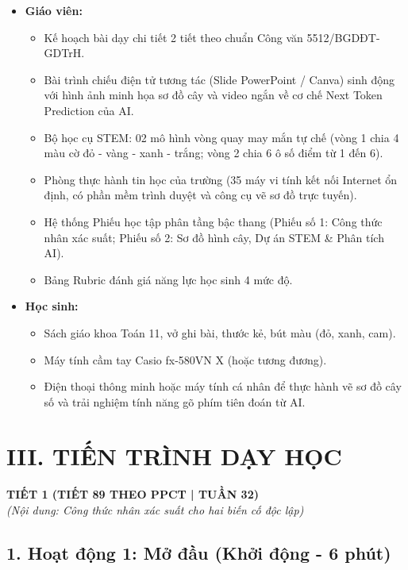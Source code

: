 \documentclass[12pt, a4paper]{article}
\begin{document}
\begin{itemize}[leftmargin=1.2cm]
    \item \textbf{Giáo viên:}
    \begin{itemize}[leftmargin=0.6cm]
        \item Kế hoạch bài dạy chi tiết 2 tiết theo chuẩn Công văn 5512/BGDĐT-GDTrH.
        \item Bài trình chiếu điện tử tương tác (Slide PowerPoint / Canva) sinh động với hình ảnh minh họa sơ đồ cây và video ngắn về cơ chế Next Token Prediction của AI.
        \item Bộ học cụ STEM: 02 mô hình vòng quay may mắn tự chế (vòng 1 chia 4 màu cờ đỏ - vàng - xanh - trắng; vòng 2 chia 6 ô số điểm từ 1 đến 6).
        \item Phòng thực hành tin học của trường (35 máy vi tính kết nối Internet ổn định, có phần mềm trình duyệt và công cụ vẽ sơ đồ trực tuyến).
        \item Hệ thống Phiếu học tập phân tầng bậc thang (Phiếu số 1: Công thức nhân xác suất; Phiếu số 2: Sơ đồ hình cây, Dự án STEM \& Phân tích AI).
        \item Bảng Rubric đánh giá năng lực học sinh 4 mức độ.
    \end{itemize}
    \item \textbf{Học sinh:}
    \begin{itemize}[leftmargin=0.6cm]
        \item Sách giáo khoa Toán 11, vở ghi bài, thước kẻ, bút màu (đỏ, xanh, cam).
        \item Máy tính cầm tay Casio fx-580VN X (hoặc tương đương).
        \item Điện thoại thông minh hoặc máy tính cá nhân để thực hành vẽ sơ đồ cây số và trải nghiệm tính năng gõ phím tiên đoán từ AI.
    \end{itemize}
\end{itemize}

\section*{III. TIẾN TRÌNH DẠY HỌC}

\begin{center}
    \textbf{\large TIẾT 1 (TIẾT 89 THEO PPCT | TUẦN 32)}\\[4pt]
    \textit{(Nội dung: Công thức nhân xác suất cho hai biến cố độc lập)}
\end{center}

\subsection*{1. Hoạt động 1: Mở đầu (Khởi động - 6 phút)}
\end{document}
